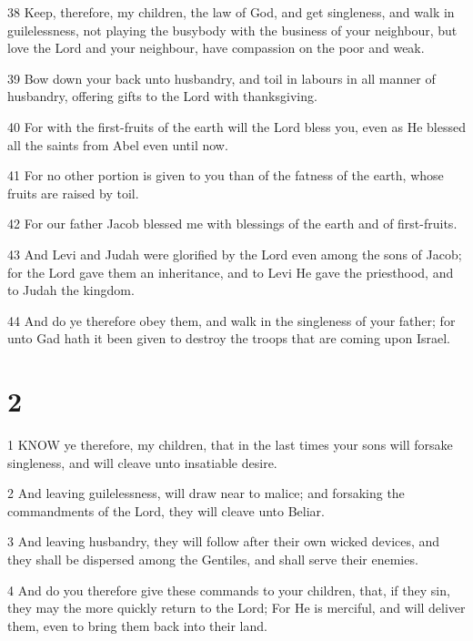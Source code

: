 \par 38 Keep, therefore, my children, the law of God, and get singleness, and walk in guilelessness, not playing the busybody with the business of your neighbour, but love the Lord and your neighbour, have compassion on the poor and weak.

\par 39 Bow down your back unto husbandry, and toil in labours in all manner of husbandry, offering gifts to the Lord with thanksgiving.

\par 40 For with the first-fruits of the earth will the Lord bless you, even as He blessed all the saints from Abel even until now.

\par 41 For no other portion is given to you than of the fatness of the earth, whose fruits are raised by toil.

\par 42 For our father Jacob blessed me with blessings of the earth and of first-fruits.

\par 43 And Levi and Judah were glorified by the Lord even among the sons of Jacob; for the Lord gave them an inheritance, and to Levi He gave the priesthood, and to Judah the kingdom.

\par 44 And do ye therefore obey them, and walk in the singleness of your father; for unto Gad hath it been given to destroy the troops that are coming upon Israel.

\chapter{2}

\par 1 KNOW ye therefore, my children, that in the last times your sons will forsake singleness, and will cleave unto insatiable desire.

\par 2 And leaving guilelessness, will draw near to malice; and forsaking the commandments of the Lord, they will cleave unto Beliar.

\par 3 And leaving husbandry, they will follow after their own wicked devices, and they shall be dispersed among the Gentiles, and shall serve their enemies.

\par 4 And do you therefore give these commands to your children, that, if they sin, they may the more quickly return to the Lord; For He is merciful, and will deliver them, even to bring them back into their land.

